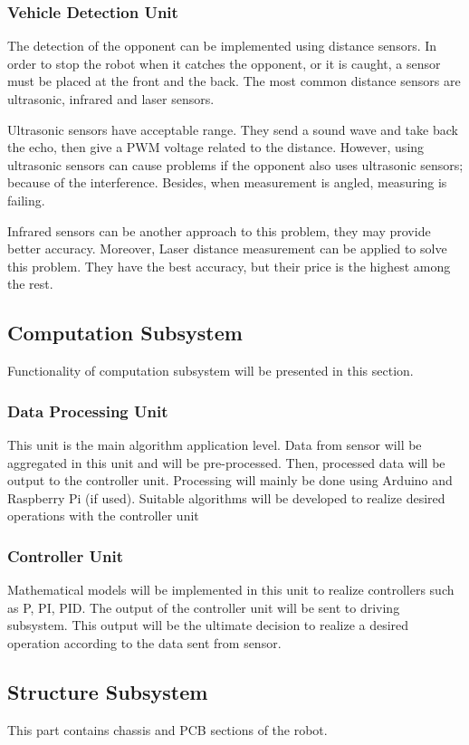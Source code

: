 \documentclass[a4paper,12pt]{article}
\begin{document}
\subsubsection{Vehicle Detection Unit}
The detection of the opponent can be implemented using distance sensors. In order to stop the robot when it catches the opponent, or it is caught, a sensor must be placed at the front and the back. The most common distance sensors are ultrasonic, infrared and laser sensors. 

Ultrasonic sensors have acceptable range. They send a sound wave and take back the echo, then give a PWM voltage related to the distance. However, using ultrasonic sensors can cause problems if the opponent also uses ultrasonic sensors; because of the interference. Besides, when measurement is angled, measuring is failing. 

Infrared sensors can be another approach to this problem, they may provide better accuracy. Moreover, Laser distance measurement can be applied to solve this problem. They have the best accuracy, but their price is the highest among the rest.
\subsection{Computation Subsystem}
Functionality of computation subsystem will be presented in this section.
\subsubsection{Data Processing Unit}
This unit is the main algorithm application level. Data from sensor will be aggregated in this unit and will be pre-processed. Then, processed data will be output to the controller unit. Processing will mainly be done using Arduino and Raspberry Pi (if used). Suitable algorithms will be developed to realize desired operations with the controller unit

\subsubsection{Controller Unit}
Mathematical models will be implemented in this unit to realize controllers such as P, PI, PID. The output of the controller unit will be sent to driving subsystem. This output will be the ultimate decision to realize a desired operation according to the data sent from sensor.
\subsection{Structure Subsystem}
This part contains chassis and PCB sections of the robot. 
\end{document}
